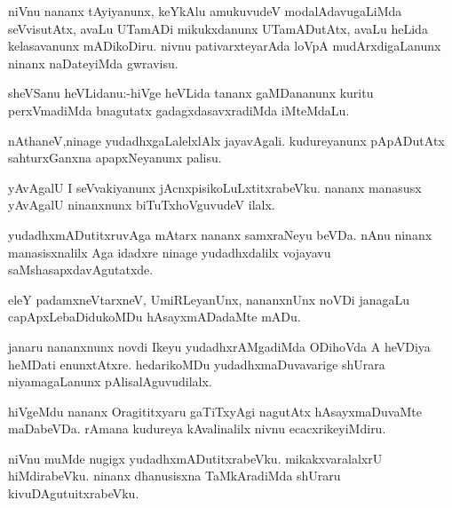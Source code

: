 \documentclass{article}
\begin{document}
\begin{mn}%
niVnu nananx tAyiyanunx, keYkAlu amukuvudeV modalAdavugaLiMda seVvisutAtx, avaLu UTamADi 
mikukxdanunx UTamADutAtx, avaLu heLida kelasavanunx mADikoDiru. nivnu pativarxteyarAda 
loVpA mudArxdigaLanunx ninanx naDateyiMda gwravisu.
\end{mn}


\begin{mn}%
sheVSanu heVLidanu:-hiVge heVLida tananx gaMDananunx kuritu perxVmadiMda bnagutatx 
gadagxdasavxradiMda iMteMdaLu.
\end{mn}

\begin{mn}%
nAthaneV,ninage yudadhxgaLalelxlAlx jayavAgali. kudureyanunx pApADutAtx sahturxGanxna 
apapxNeyanunx palisu.
\end{mn}

\begin{mn}%
yAvAgalU I seVvakiyanunx jAcnxpisikoLuLxtitxrabeVku. nananx manasusx yAvAgalU ninanxnunx 
biTuTxhoVguvudeV ilalx.
\end{mn}

\begin{mn}%
yudadhxmADutitxruvAga mAtarx nananx samxraNeyu beVDa. nAnu ninanx manasisxnalilx Aga 
idadxre ninage yudadhxdalilx vojayavu saMshasapxdavAgutatxde.
\end{mn}

\begin{mn}%
eleY padamxneVtarxneV, UmiRLeyanUnx, nananxnUnx noVDi janagaLu capApxLebaDidukoMDu 
hAsayxmADadaMte mADu.
\end{mn}

\begin{mn}%
janaru nananxnunx novdi Ikeyu yudadhxrAMgadiMda ODihoVda A heVDiya heMDati enunxtAtxre. 
hedarikoMDu yudadhxmaDuvavarige shUrara niyamagaLanunx pAlisalAguvudilalx.
\end{mn}

\begin{mn}%
hiVgeMdu nananx Oragititxyaru gaTiTxyAgi nagutAtx hAsayxmaDuvaMte maDabeVDa. rAmana 
kudureya kAvalinalilx nivnu ecacxrikeyiMdiru.
\end{mn}

\begin{mn}%
niVnu muMde nugigx yudadhxmADutitxrabeVku. mikakxvaralalxrU hiMdirabeVku. ninanx dhanusisxna
TaMkAradiMda shUraru kivuDAgutuitxrabeVku.
\end{mn}
\end{document}

